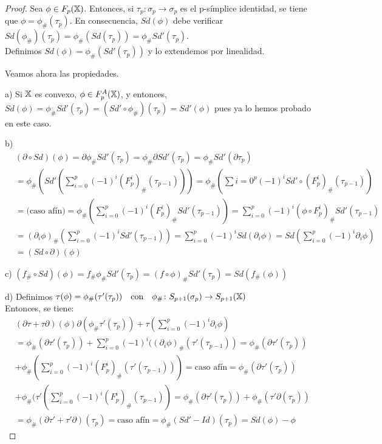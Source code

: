\begin{proof}
  Sea $\phi \in F_p({\mathbb X})$. Entonces, si $\tau_p \colon \sigma_p \to \sigma_p$ es el p-símplice identidad, se tiene que
  $\phi = \phi_\#(\tau_p)$. En consecuencia, $Sd(\phi)$ debe verificar $Sd(\phi_\#)(\tau_p) = \phi_\#(Sd(\tau_p)) = \phi_\# Sd'(\tau_p)$. \\
  Definimos $Sd(\phi) = \phi_\#(Sd'(\tau_p))$ y lo extendemos por linealidad.

  Veamos ahora las propiedades.

  a) Si ${\mathbb X}$ es convexo, $\phi \in F_p^A({\mathbb X})$, y entonces, $Sd(\phi) = \phi_\# Sd'(\tau_p) = (Sd' \circ \phi_\#)(\tau_p) = Sd'(\phi)$
  pues ya lo hemos probado en este caso.

  b) \begin{align*}
    &(\partial \circ Sd)(\phi) = \partial \phi_\# Sd'(\tau_p) = \phi_\# \partial Sd'(\tau_p) = \phi_\# Sd'(\partial \tau_p) \\
    &= \phi_\#(Sd'(\sum\limits_{i = 0}^p (-1)^i (F_p^i)_\# (\tau_{p-1}))) = \phi_\#(\sum\limits{i = 0}^p (-1)^i Sd' \circ (F_p^i)_\#(\tau_{p-1}))\\
    &= \text{(caso afín)} = \phi_\#(\sum\limits_{i = 0}^p (-1)^i (F_p^i)_\# Sd'(\tau_{p-1})) = \sum\limits_{i = 0}^p (-1)^i (\phi \circ F_p^i)_\# Sd'(\tau_{p-1}) \\
    &= (\partial_i \phi)_\# (\sum\limits_{i = 0}^p (-1)^i Sd'(\tau_{p-1})) = \sum\limits_{i = 0}^p (-1)^i Sd(\partial_i \phi) = Sd(\sum\limits_{i = 0}^p (-1)^i \partial_i \phi) \\
    &= (Sd \circ \partial)(\phi)
  \end{align*}

  c) $(f_\# \circ Sd)(\phi) = f_\# \phi_\# Sd'(\tau_p) = (f \circ \phi)_\# Sd'(\tau_p) = Sd(f_\#(\phi))$

  d) Definimos $\tau(\phi) = \phi_\#(\tau'(\tau_p)) \quad \text{con} \quad \phi_\# \colon S_{p+1}(\sigma_p) \to S_{p+1}({\mathbb X})$ \\
  Entonces, se tiene:
  \begin{align*}
    &(\partial \tau + \tau \partial)(\phi) \partial(\phi_\# \tau'(\tau_p)) + \tau(\sum\limits_{i = 0}^p (-1)^i \partial_i \phi) \\
    &= \phi_\#(\partial \tau'(\tau_p)) + \sum\limits_{i = 0}^p (-1)^i((\partial_i \phi)_\#(\tau'(\tau_{p-1})) = \phi_\#(\partial \tau'(\tau_p)) \\
    &+ \phi_\#(\sum\limits_{i = 0}^p (-1)^i (F_p^i)_\# (\tau'(\tau_{p-1}))) = \text{caso afín} = \phi_\#(\partial \tau'(\tau_p)) \\
    &+ \phi_\#(\tau'(\sum\limits_{i = 0}^p (-1)^i (F_p^i)_\#(\tau_{p-1})) = \phi_\#(\partial \tau'(\tau_p)) + \phi_\#(\tau'\partial(\tau_p)) \\
    &= \phi_\#(\partial \tau' + \tau' \partial)(\tau_p) = \text{caso afín} = \phi_\#(Sd' - Id)(\tau_p) = Sd(\phi) - \phi
  \end{align*}


\end{proof}
